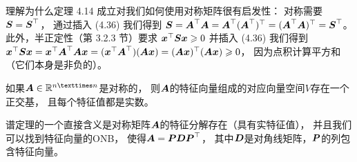 理解为什么定理 4.14 成立对我们如何使用对称矩阵很有启发性：
对称需要$\S = \S^\top$，
通过插入 (4.36) 我们得到
$\S = \A^\top \A = \A^\top(\A^\top )^\top = (\A^\top \A)^\top = \S^\top$。
此外，半正定性（第 3.2.3 节）要求
$\x^\top \S\x \geqslant 0$
并插入 (4.36) 我们得到
$\x^\top \S\x = \x^\top \A^\top \A\x = (\x^\top \A^\top)(\A\x) = (\A\x)^\top (\A\x ) \geqslant 0$，
因为点积计算平方和（它们本身是非负的）。

\begin{theorem}[谱定理]
    如果$\A \in \R^{n×n}$是对称的，
    则$\A$的特征向量组成的对应向量空间$V$存在一个正交基，
    且每个特征值都是实数。
\end{theorem}

谱定理的一个直接含义是对称矩阵$\A$的特征分解存在（具有实特征值），
并且我们可以找到特征向量的ONB，
使得$\A = \bs{P}\bs{D}\bs{P}^\top$，
其中$\bs{D}$是对角线矩阵，$\bs{P}$的列包含特征向量。

